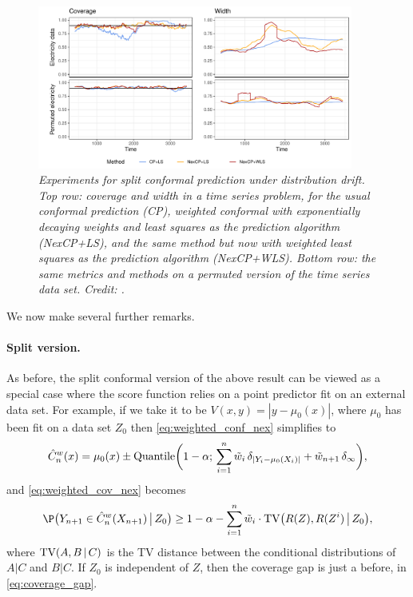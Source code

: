 \documentclass{article}
\begin{document}
\begin{figure}[htb]
\centering
\includegraphics[width=0.925\textwidth]{electricity.pdf}
\caption{\it Experiments for split conformal prediction under distribution
  drift. Top row: coverage and width in a time series problem, for the usual
  conformal prediction (CP), weighted conformal with exponentially decaying
  weights and least squares as the prediction algorithm (NexCP+LS), and the same
  method but now with weighted least squares as the prediction algorithm 
  (NexCP+WLS). Bottom row: the same metrics and methods on a permuted version of 
  the time series data set. Credit: \citet{barber2023conformal}.}        
\label{fig:electricity}
\end{figure}

We now make several further remarks. 

\paragraph{Split version.}

As before, the split conformal version of the above result can be viewed as a
special case where the score function relies on a point predictor fit on an
external data set. For example, if we take it to be $V(x,y) = |y-\mu_0(x)|$,
where $\mu_0$ has been fit on a data set $Z_0$ then \eqref{eq:weighted_conf_nex}
simplifies to            
\[
\hat{C}^w_n(x) = \mu_0(x) \pm \mathrm{Quantile}\bigg(1-\alpha; \, \sum_{i=1}^n \tilde{w}_i \,
\delta_{|Y_i - \mu_0(X_i)|} + \tilde{w}_{n+1} \, \delta_\infty \bigg),
\]
and \eqref{eq:weighted_cov_nex} becomes
\[
\P\big( Y_{n+1} \in \hC^w_n(X_{n+1}) \,\big|\, Z_0 \big) \geq 1-\alpha -
\sum_{i=1}^n \tw_i \cdot \TV\big( R(Z), R(Z^i) \,\big|\, Z_0 \big), 
\]
where $\mathrm{TV}(A, B \,|\, C)$ is the TV distance between the conditional
distributions of $A|C$ and $B|C$. If $Z_0$ is independent of $Z$, then the
coverage gap is just a before, in \eqref{eq:coverage_gap}.
\end{document}
